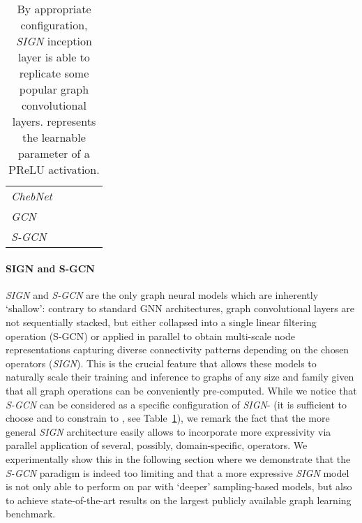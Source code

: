 \documentclass{article}
\begin{document}
\begin{table}[t!]
    \caption{By appropriate configuration, \textit{SIGN} inception layer is able to replicate some popular graph convolutional layers.  represents the learnable parameter of a PReLU activation.}
    \label{tab:reduction}
    \centering
    \begin{tabular}{| l | c c c c |}
        \hline
            & 
            & 
            & 
            &  \\
        \hline
        \textit{ChebNet} \cite{defferrard2016convolutional}
            & 
            & 
            & 
            &  \\
        
        \textit{GCN} \cite{kipf2016semi}
            & 
            & 
            & 
            & \\
        
        \textit{S-GCN} \cite{pmlr-v97-wu19e}
            & 
            & 
            & 
            & \\
        
        \hline
    \end{tabular}\end{table}

\paragraph{SIGN and S-GCN}
\textit{SIGN} and \textit{S-GCN} are the only graph neural models which are inherently `shallow': contrary to standard GNN architectures, graph convolutional layers are not sequentially stacked, but either collapsed into a single linear filtering operation (S-GCN) or applied in parallel to obtain multi-scale node representations capturing diverse connectivity patterns depending on the chosen operators (\textit{SIGN}). This is the crucial feature that allows these models to naturally scale their training and inference to graphs of any size and family given that all graph operations can be conveniently pre-computed. While we notice that \textit{S-GCN} can be considered as a specific configuration of \textit{SIGN}- (it is sufficient to choose  and to constrain  to , see Table~\ref{tab:reduction}), we remark the fact that the more general \textit{SIGN} architecture easily allows to incorporate more expressivity via parallel application of several, possibly, domain-specific, operators. We experimentally show this in the following section where we demonstrate that the \textit{S-GCN} paradigm is indeed too limiting and that a more expressive \textit{SIGN} model is not only able to perform on par with `deeper' sampling-based models, but also to achieve state-of-the-art results on the largest publicly available graph learning benchmark.
\end{document}
